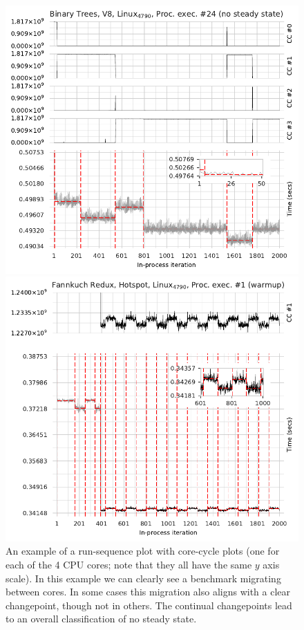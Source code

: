 \documentclass[acmsmall]{acmart}\settopmatter{printfolios=true}
\begin{document}
\begin{figure}[t]
\centering
\begin{minipage}[t]{0.485\textwidth}
\includegraphics[width=\textwidth]{examples/new_no_steady.pdf}
\caption{An example of a run-sequence plot with core-cycle plots (one
for each of the 4 CPU cores; note that they all have the same $y$ axis scale). In this
example we can clearly see a benchmark migrating between cores. In some
cases this migration also aligns with a clear changepoint, though not
in others. The continual changepoints lead to an overall classification
of no steady state.}
\label{fig:examples:nosteadystate}
\end{minipage}%
\hfill%
\begin{minipage}[t]{0.485\textwidth}
\includegraphics[width=\textwidth]{examples/new_cyclic.pdf}

\end{minipage}
\end{figure}
\end{document}
